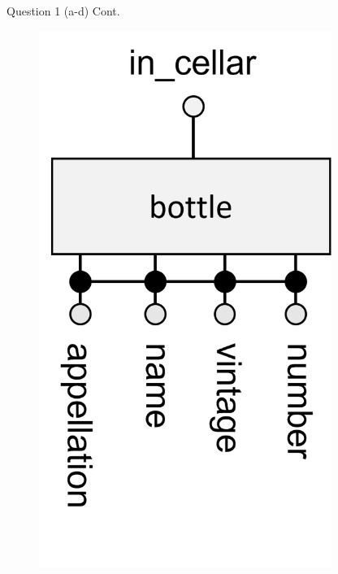 \begin{frame}[fragile]{Question 1 (a-d) Cont.}
\begin{figure}
\begin{columns}
			\includegraphics[width=0.85\textwidth]{t4/images/bottle_entity_3fk.png}
		\end{columns}
	\end{figure}	
\end{frame}

